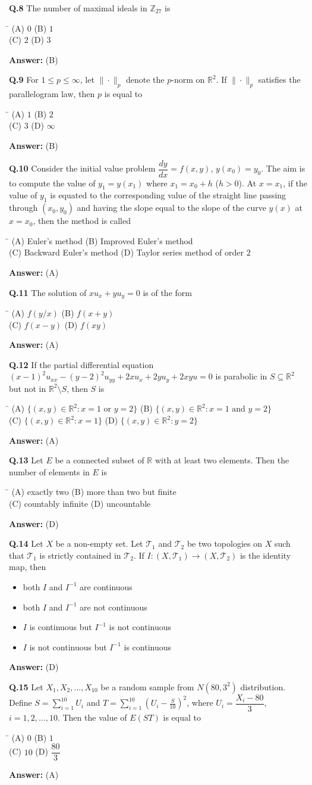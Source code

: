 \documentclass[11pt,a4paper]{article}
\newcommand{\optsfourA}[4]{%
  \begin{tabbing}
    \hspace{0.48\linewidth}\=\kill
    (A) #1 \> (B) #2 \\[2pt]
    (C) #3 \> (D) #4
  \end{tabbing}%
}
\newcommand{\optslistA}[4]{%
  \begin{itemize}
    \setlength{\itemsep}{2pt}\setlength{\parskip}{0pt}
    \item[(A)] #1
    \item[(B)] #2
    \item[(C)] #3
    \item[(D)] #4
  \end{itemize}%
}
\newcommand{\ans}[1]{\textbf{Answer:} #1\par\medskip}
\begin{document}
\textbf{Q.8} The number of maximal ideals in $\mathbb{Z}_{27}$ is
\optsfourA{$0$}{$1$}{$2$}{$3$}
\ans{(B)}

\textbf{Q.9} For $1 \le p \le \infty$, let $\|\cdot\|_p$ denote the $p$-norm on $\mathbb{R}^2$. If $\|\cdot\|_p$ satisfies the parallelogram law, then $p$ is equal to
\optsfourA{$1$}{$2$}{$3$}{$\infty$}
\ans{(B)}

\textbf{Q.10} Consider the initial value problem $\dfrac{dy}{dx} = f(x, y)$, $y(x_0) = y_0$. The aim is to compute the value of $y_1 = y(x_1)$ where $x_1 = x_0 + h$ ($h > 0$). At $x = x_1$, if the value of $y_1$ is equated to the corresponding value of the straight line passing through $(x_0, y_0)$ and having the slope equal to the slope of the curve $y(x)$ at $x = x_0$, then the method is called
\optsfourA{Euler's method}{Improved Euler's method}{Backward Euler's method}{Taylor series method of order $2$}
\ans{(A)}

\textbf{Q.11} The solution of $x u_x + y u_y = 0$ is of the form
\optsfourA{$f(y/x)$}{$f(x + y)$}{$f(x - y)$}{$f(xy)$}
\ans{(A)}

\textbf{Q.12} If the partial differential equation $(x - 1)^2 u_{xx} - (y - 2)^2 u_{yy} + 2x u_x + 2y u_y + 2xy u = 0$ is parabolic in $S \subseteq \mathbb{R}^2$ but not in $\mathbb{R}^2 \setminus S$, then $S$ is
\optsfourA{$\{(x,y) \in \mathbb{R}^2 : x = 1 \text{ or } y = 2\}$}{$\{(x,y) \in \mathbb{R}^2 : x = 1 \text{ and } y = 2\}$}{$\{(x,y) \in \mathbb{R}^2 : x = 1\}$}{$\{(x,y) \in \mathbb{R}^2 : y = 2\}$}
\ans{(A)}

\textbf{Q.13} Let $E$ be a connected subset of $\mathbb{R}$ with at least two elements. Then the number of elements in $E$ is
\optsfourA{exactly two}{more than two but finite}{countably infinite}{uncountable}
\ans{(D)}

\textbf{Q.14} Let $X$ be a non-empty set. Let $\mathcal{T}_1$ and $\mathcal{T}_2$ be two topologies on $X$ such that $\mathcal{T}_1$ is strictly contained in $\mathcal{T}_2$. If $I : (X, \mathcal{T}_1) \to (X, \mathcal{T}_2)$ is the identity map, then
\optslistA{both $I$ and $I^{-1}$ are continuous}{both $I$ and $I^{-1}$ are not continuous}{$I$ is continuous but $I^{-1}$ is not continuous}{$I$ is not continuous but $I^{-1}$ is continuous}
\ans{(D)}

\textbf{Q.15} Let $X_1, X_2, \dots, X_{10}$ be a random sample from $N(80, 3^2)$ distribution. Define $S = \displaystyle\sum_{i=1}^{10} U_i$ and $T = \displaystyle\sum_{i=1}^{10} \left(U_i - \frac{S}{10}\right)^2$, where $U_i = \dfrac{X_i - 80}{3}$, $i = 1, 2, \dots, 10$. Then the value of $E(ST)$ is equal to
\optsfourA{$0$}{$1$}{$10$}{$\dfrac{80}{3}$}
\ans{(A)}
\end{document}
